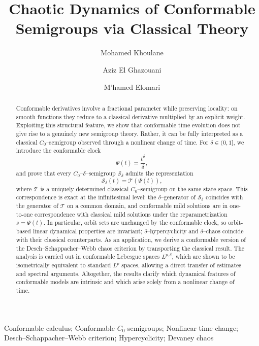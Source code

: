 \documentclass[preprint,12pt]{elsarticle}
\begin{document}
\begin{frontmatter}

\title{Chaotic Dynamics of Conformable Semigroups via Classical Theory}

\author[label1]{Mohamed Khoulane}
\author[label1]{Aziz El Ghazouani}
\author[label1]{M'hamed Elomari}

\begin{abstract} Conformable derivatives involve a fractional parameter while preserving locality: on smooth functions they reduce to a classical derivative multiplied by an explicit weight. Exploiting this structural feature, we show that conformable time evolution does not give rise to a genuinely new semigroup theory. Rather, it can be fully interpreted as a classical $C_0$--semigroup observed through a nonlinear change of time. For $\delta\in(0,1]$, we introduce the conformable clock
\[
\Psi(t)=\frac{t^\delta}{\delta},
\]
and prove that every $C_0$--$\delta$--semigroup $\mathcal S_\delta$ admits the representation
\[
\mathcal S_\delta(t)=\mathcal T(\Psi(t)),
\]
where $\mathcal T$ is a uniquely determined classical $C_0$--semigroup on the same state space. This correspondence is exact at the infinitesimal level: the $\delta$--generator of $\mathcal S_\delta$ coincides with the generator of $\mathcal T$ on a common domain, and conformable mild solutions are in one-to-one correspondence with classical mild solutions under the reparametrization $s=\Psi(t)$. In particular, orbit sets are unchanged by the conformable clock, so orbit-based linear dynamical properties are invariant; $\delta$--hypercyclicity and $\delta$--chaos coincide with their classical counterparts. As an application, we derive a conformable version of the Desch--Schappacher--Webb chaos criterion by transporting the classical result. The analysis is carried out in conformable Lebesgue spaces $L^{p,\delta}$, which are shown to be isometrically equivalent to standard $L^p$ spaces, allowing a direct transfer of estimates and spectral arguments. Altogether, the results clarify which dynamical features of conformable models are intrinsic and which arise solely from a nonlinear change of time.
\end{abstract}

\begin{keyword} Conformable calculus; Conformable $C_0$-semigroups; Nonlinear time change; Desch--Schappacher--Webb criterion; Hypercyclicity; Devaney chaos
\end{keyword}
\end{frontmatter}
\end{document}
